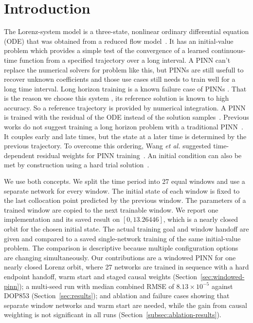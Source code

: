 \documentclass[conference,a4paper]{IEEEtran}
\begin{document}
\section{Introduction}
The Lorenz-system model is a three-state, nonlinear ordinary differential equation (ODE) that was obtained from a reduced flow model~\cite{lorenz1960}. It has an initial-value problem which provides a simple test of the convergence of a learned continuous-time function from a specified trajectory over a long interval. A PINN can't replace the numerical solvers for problem like this, but PINNs are still usefull to recover unknown coefficients \cite{raissi2019} and those use cases still needs to train well for a long time interval. Long horizon training is a known failure case of PINNs \cite{wang2024causal,krishnapriyan2021}. That is the reason we choose this system , its reference solution is known to high accuracy. So a reference trajectory is provided by numerical integration.  A PINN is trained with the residual of the ODE instead of the solution samples~\cite{raissi2019}. Previous works do not suggest training a long horizon problem with a traditional PINN~\cite{wang2024causal}. It couples early and late times, but the state at a later time is determined by the previous trajectory. To overcome this ordering, Wang \emph{et al.} suggested time-dependent residual weights for PINN training~\cite{wang2024causal}. An initial condition can also be met by construction using a hard trial solution~\cite{lagaris1998}.

We use both concepts. We split the time period into 27 equal windows and use a separate network for every window. The initial state of each window is fixed to the last collocation point predicted by the previous window. The parameters of a trained window are copied to the next trainable window. We report one implementation and its saved result on $[0,13.26446]$, which is a nearly closed orbit for the chosen initial state. The actual training goal and window handoff are given and compared to a saved single-network training of the same initial-value problem. The comparison is descriptive because multiple configuration options are changing simultaneously. Our contributions are a windowed PINN for one nearly closed Lorenz orbit, where 27 networks are trained in sequence with a hard endpoint handoff, warm start and staged causal weights (Section~\ref{sec:windowed-pinn}); a multi-seed run with median combined RMSE of $8.13\times10^{-5}$ against DOP853 (Section~\ref{sec:results}); and ablation and failure cases showing that separate window networks and warm start are needed, while the gain from causal weighting is not significant in all runs (Section~\ref{subsec:ablation-results}).
\end{document}
